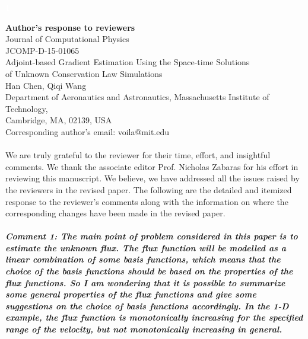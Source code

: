 \documentclass[a4paper,twoside]{article}
\begin{document}
\setcounter{page}{1}

\textcolor{white}{1}

\vspace{1cm}
\centering
\textbf{Author's response to reviewers} \\
\vspace{1cm}
Journal of Computational Physics\\
JCOMP-D-15-01065\\
\vspace{.5cm}
Adjoint-based Gradient Estimation
Using the Space-time Solutions\\
of Unknown Conservation Law Simulations\\
\vspace{.5cm}
Han Chen, Qiqi Wang\\
\vspace{.5cm}
Department of Aeronautics and Astronautics, Massachusetts Institute of Technology,\\ Cambridge, MA, 02139, USA\\
\vspace{.5cm}
Corresponding author's email: voila@mit.edu\\

\justify
\noindent\makebox[\linewidth]{\rule{.75\paperwidth}{0.4pt}}\\

We are truly grateful to the reviewer for their time, effort, and insightful comments. 
We thank the associate editor Prof. Nicholas Zabaras for his effort in reviewing this manuscript.
We believe,
we have addressed all the issues raised by the reviewers in the revised paper. The following are the detailed
and itemized response to the reviewer's comments along with the information on where the corresponding changes have
been made in the revised paper.\\

\noindent\makebox[\linewidth]{\rule{.75\paperwidth}{0.4pt}}\\

\emph{\textbf{Comment 1:
The main point of problem considered in this paper is to estimate the unknown flux. The flux function will be modelled as a linear combination of some basis functions, which means that the choice of the basis functions should be based on the properties of the flux functions. So I am wondering that it is possible to summarize some general properties of the flux functions and give some suggestions on the choice of basis functions accordingly. In the 1-D example, the flux function is monotonically increasing for the specified range of the velocity, but not monotonically increasing in general.}}\\
\end{document}
